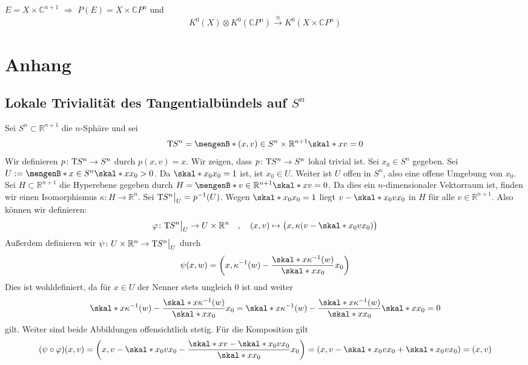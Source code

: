 $E=X \times \mathds{C}^{n+1}$ $\Rightarrow $ $P(E)=X \times \mathds{C}P^n$ und 
\[
	K^0(X) \otimes K^0(\mathds{C}P^n) \xrightarrow{\cong} K^0(X \times \mathds{C}P^n) 
\]






\cleardoubleoddemptypage
\appendix
\section{Anhang}








\subsection{Lokale Trivialität des Tangentialbündels auf $S^n$} %
\label{sub:lokal_trivial_Sn}
Sei $S^n \subset \mathds{R}^{n+1}$ die $n$-Sphäre und sei 
\[
	\Tmap S^n = \set[(x,v) \in S^n \times \mathds{R}^{n+1}]{\skal*{x}{v}=0} 
\]
Wir definieren $p \colon \mathrm{T}\mkern-0.85mu S^n \to S^n$ durch $p(x,v)=x$. Wir zeigen, dass $p \colon \mathrm{T}\mkern-0.85mu S^n \to S^n$ lokal trivial ist.
Sei $x_0 \in S^n$ gegeben. Sei $U := \set[x \in S^n]{\skal*{x}{x_0}>0}$. Da $\skal*{x_0}{x_0}=1$ ist, ist $x_0 \in U$. Weiter ist $U$ offen in $S^n$, also eine offene 
Umgebung von $x_0$. Sei $H \subset \mathds{R}^{n+1}$ die Hyperebene gegeben durch $H = \set[v \in \mathds{R}^{n+1}]{\skal*{x}{v}=0}$. Da dies ein $n$-dimensionaler 
Vektorraum ist, finden wir einen Isomorphismus $\kappa \colon H \to \mathds{R}^n$. Sei $\mathrm{T}\mkern-0.85mu S^n \big|_U=p^{-1}(U)$. Wegen $\skal*{x_0}{x_0}=1$ liegt $v- \skal*{x_0}{v} x_0$
in $H$ für alle $v \in \mathds{R}^{n+1}$. Also können wir definieren:
\[
	\varphi \colon \Tmap S^n\big|_{U} \to U \times \mathds{R}^n \quad , \quad (x,v) \mapsto \enbrace[\big]{x, \kappa(v - \skal*{x_0}{v} x_0)} 
\]
Außerdem definieren wir $\psi \colon U \times \mathbb{R}^n \to \mathrm{T}\mkern-0.85mu S^n \big|_U$ durch
\[
	\psi(x,w) = \enbrace*{x , \kappa^{-1}(w) - \frac{\skal*{x}{\kappa^{-1}(w)}}{\skal*{x}{x_0}} x_0 } 
\]
Dies ist wohldefiniert, da für $x \in U$ der Nenner stets ungleich $0$ ist und weiter
\[
	\skal*{x}{\kappa^{-1}(w) - \frac{\skal*{x}{\kappa ^{-1}(w)}}{\skal*{x}{x_0}} x_0} = \skal*{x}{\kappa^{-1}(w)} - \frac{\skal*{x}{\kappa ^{-1}(w)}}{\skal*{x}{x_0}} 
	\skal*{x}{x_0} = 0
\]
gilt. Weiter sind beide Abbildungen offensichtlich stetig. Für die Komposition gilt
\begin{align*}
	(\psi \circ \varphi)(x,v) = \enbrace*{x, v - \skal*{x_0}{v} x_0 - \frac{\skal*{x}{v- \skal*{x_0}{v} x_0}}{\skal*{x}{x_0}}x_0 }
	= \enbrace*{x, v - \skal*{x_0}{v} x_0 + \skal*{x_0}{v}x_0} = (x,v)  
\end{align*}
